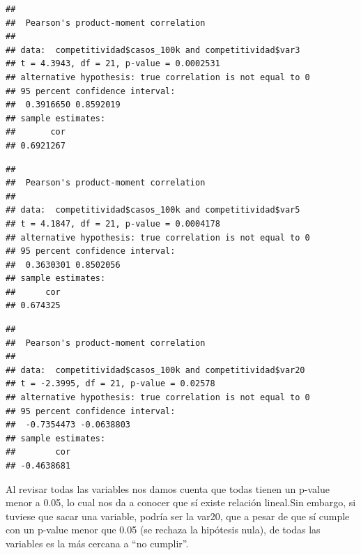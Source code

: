 \documentclass[
]{article}
\newenvironment{Shaded}{\begin{snugshade}}{\end{snugshade}}
\newcommand{\FunctionTok}[1]{\textcolor[rgb]{0.00,0.00,0.00}{#1}}
\newcommand{\NormalTok}[1]{#1}
\newcommand{\SpecialCharTok}[1]{\textcolor[rgb]{0.00,0.00,0.00}{#1}}
\begin{document}
\begin{verbatim}
## 
##  Pearson's product-moment correlation
## 
## data:  competitividad$casos_100k and competitividad$var3
## t = 4.3943, df = 21, p-value = 0.0002531
## alternative hypothesis: true correlation is not equal to 0
## 95 percent confidence interval:
##  0.3916650 0.8592019
## sample estimates:
##       cor 
## 0.6921267
\end{verbatim}

\begin{Shaded}
\end{Shaded}

\begin{verbatim}
## 
##  Pearson's product-moment correlation
## 
## data:  competitividad$casos_100k and competitividad$var5
## t = 4.1847, df = 21, p-value = 0.0004178
## alternative hypothesis: true correlation is not equal to 0
## 95 percent confidence interval:
##  0.3630301 0.8502056
## sample estimates:
##      cor 
## 0.674325
\end{verbatim}

\begin{Shaded}
\end{Shaded}

\begin{verbatim}
## 
##  Pearson's product-moment correlation
## 
## data:  competitividad$casos_100k and competitividad$var20
## t = -2.3995, df = 21, p-value = 0.02578
## alternative hypothesis: true correlation is not equal to 0
## 95 percent confidence interval:
##  -0.7354473 -0.0638803
## sample estimates:
##        cor 
## -0.4638681
\end{verbatim}

Al revisar todas las variables nos damos cuenta que todas tienen un
p-value menor a 0.05, lo cual nos da a conocer que sí existe relación
lineal.Sin embargo, si tuviese que sacar una variable, podría ser la
var20, que a pesar de que sí cumple con un p-value menor que 0.05 (se
rechaza la hipótesis nula), de todas las variables es la más cercana a
``no cumplir''.
\end{document}
